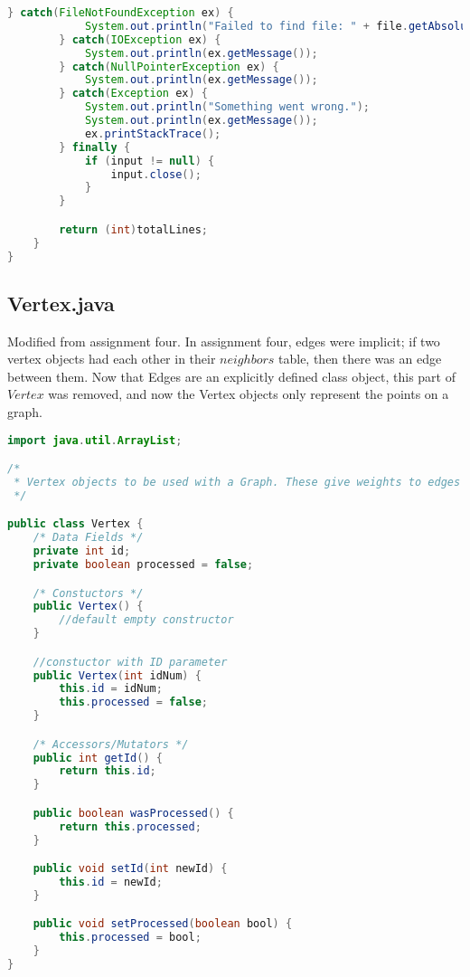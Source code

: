 \documentclass[letterpaper, 10pt,DIV=13]{scrartcl}
\numberwithin{equation}{section} %
\numberwithin{figure}{section} %
\numberwithin{table}{section} %
\begin{document}
\begin{lstlisting}[frame=single, language=java, breaklines]
        } catch(FileNotFoundException ex) {
            System.out.println("Failed to find file: " + file.getAbsolutePath());
        } catch(IOException ex) {
            System.out.println(ex.getMessage());
        } catch(NullPointerException ex) {
            System.out.println(ex.getMessage());
        } catch(Exception ex) {
            System.out.println("Something went wrong.");
            System.out.println(ex.getMessage());
            ex.printStackTrace();
        } finally {
            if (input != null) {
                input.close();
            }
        }

        return (int)totalLines;
    }
}
\end{lstlisting}
\pagebreak

\subsection{Vertex.java}
Modified from assignment four. In assignment four, edges were implicit; if two vertex objects had each other in their $neighbors$ table, then there was an edge between them. Now that Edges are an explicitly defined class object, this part of $Vertex$ was removed, and now the Vertex objects only represent the points on a graph.
\begin{lstlisting}[frame=single, language=java, breaklines]  
import java.util.ArrayList;

/*
 * Vertex objects to be used with a Graph. These give weights to edges in one direction, creating a directed graph.
 */

public class Vertex {
    /* Data Fields */
    private int id;
    private boolean processed = false;

    /* Constuctors */
    public Vertex() {
        //default empty constructor
    }

    //constuctor with ID parameter
    public Vertex(int idNum) {
        this.id = idNum;
        this.processed = false;
    }

    /* Accessors/Mutators */
    public int getId() {
        return this.id;
    }

    public boolean wasProcessed() {
        return this.processed;
    }

    public void setId(int newId) {
        this.id = newId;
    }

    public void setProcessed(boolean bool) {
        this.processed = bool;
    }
}
\end{lstlisting}
\end{document}
